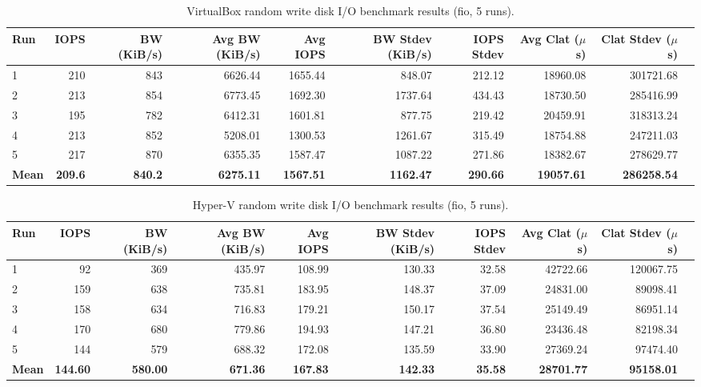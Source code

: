 \documentclass[a4paper, 12pt]{article}
\theoremstyle{plain}
\theoremstyle{definition}
\theoremstyle{remark}
\begin{document}
\begin{landscape}
    \begin{table}[H]
    \centering
    \caption{VirtualBox random write disk I/O benchmark results (fio, 5 runs).}
    \label{tab:io-write-vbox}
    \begin{tabular}{lrrrrrrrrr}
    \hline
    \textbf{Run} & \textbf{IOPS} & \textbf{BW (KiB/s)} & \textbf{Avg BW (KiB/s)} & \textbf{Avg IOPS} & \textbf{BW Stdev (KiB/s)} & \textbf{IOPS Stdev} & \textbf{Avg Clat ($\mu$s)} & \textbf{Clat Stdev ($\mu$s)} \\
    \hline
    1 & 210 & 843 & 6626.44 & 1655.44 & 848.07  & 212.12 & 18960.08 & 301721.68 \\
    2 & 213 & 854 & 6773.45 & 1692.30 & 1737.64 & 434.43 & 18730.50 & 285416.99 \\
    3 & 195 & 782 & 6412.31 & 1601.81 & 877.75  & 219.42 & 20459.91 & 318313.24 \\
    4 & 213 & 852 & 5208.01 & 1300.53 & 1261.67 & 315.49 & 18754.88 & 247211.03 \\
    5 & 217 & 870 & 6355.35 & 1587.47 & 1087.22 & 271.86 & 18382.67 & 278629.77 \\
    \hline
    \textbf{Mean} & \textbf{209.6} & \textbf{840.2} & \textbf{6275.11} & \textbf{1567.51} & \textbf{1162.47} & \textbf{290.66} & \textbf{19057.61} & \textbf{286258.54} \\
    \hline
    \end{tabular}
    \end{table}

    \begin{table}[H]
    \centering
    \caption{Hyper-V random write disk I/O benchmark results (fio, 5 runs).}
    \label{tab:io-write-hyperv}
    \begin{tabular}{lrrrrrrrrr}
    \hline
    \textbf{Run} & \textbf{IOPS} & \textbf{BW (KiB/s)} & \textbf{Avg BW (KiB/s)} & \textbf{Avg IOPS} & \textbf{BW Stdev (KiB/s)} & \textbf{IOPS Stdev} & \textbf{Avg Clat ($\mu$s)} & \textbf{Clat Stdev ($\mu$s)} \\
    \hline
    1 &  92 & 369 &  435.97 & 108.99 & 130.33 & 32.58 & 42722.66 & 120067.75 \\
    2 & 159 & 638 &  735.81 & 183.95 & 148.37 & 37.09 & 24831.00 &  89098.41 \\
    3 & 158 & 634 &  716.83 & 179.21 & 150.17 & 37.54 & 25149.49 &  86951.14 \\
    4 & 170 & 680 &  779.86 & 194.93 & 147.21 & 36.80 & 23436.48 &  82198.34 \\
    5 & 144 & 579 &  688.32 & 172.08 & 135.59 & 33.90 & 27369.24 &  97474.40 \\
    \hline
    \textbf{Mean} & \textbf{144.60} & \textbf{580.00} & \textbf{671.36} & \textbf{167.83} & \textbf{142.33} & \textbf{35.58} & \textbf{28701.77} & \textbf{95158.01} \\
    \hline
    \end{tabular}
    \end{table}
    \end{landscape}
\end{document}
